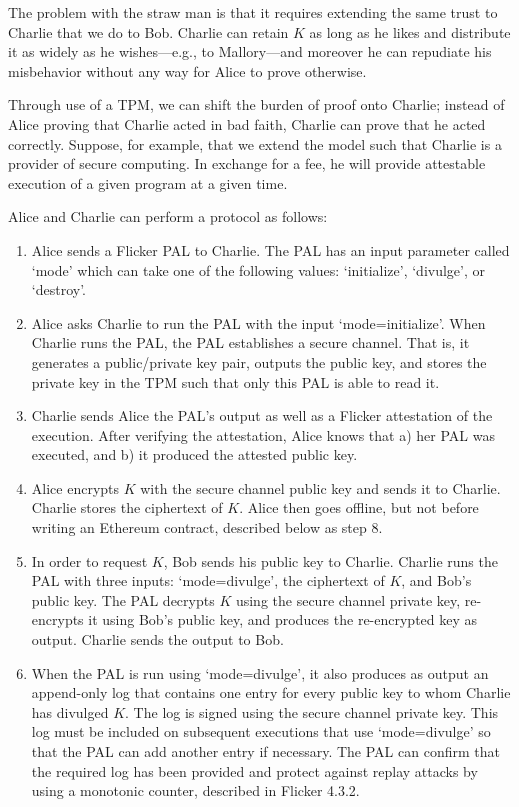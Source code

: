 \documentclass{article}
\begin{document}
The problem with the straw man is that it requires extending the same trust to Charlie that we do to Bob. Charlie can retain $K$ as long as he likes and distribute it as widely as he wishes---e.g., to Mallory---and moreover he can repudiate his misbehavior without any way for Alice to prove otherwise.

Through use of a TPM, we can shift the burden of proof onto Charlie; instead of Alice proving that Charlie acted in bad faith, Charlie can prove that he acted correctly. Suppose, for example, that we extend the model such that Charlie is a provider of secure computing. In exchange for a fee, he will provide attestable execution of a given program at a given time.

Alice and Charlie can perform a protocol as follows:

\begin{enumerate}

\item Alice sends a Flicker PAL to Charlie. The PAL has an input parameter called `mode' which can take one of the following values: `initialize', `divulge', or `destroy'. 

\item Alice asks Charlie to run the PAL with the input `mode=initialize'. When Charlie runs the PAL, the PAL establishes a secure channel. That is, it generates a public/private key pair, outputs the public key, and stores the private key in the TPM such that only this PAL is able to read it.

\item Charlie sends Alice the PAL's output as well as a Flicker attestation of the execution. After verifying the attestation, Alice knows that a) her PAL was executed, and b) it produced the attested public key.

\item Alice encrypts $K$ with the secure channel public key and sends it to Charlie. Charlie stores the ciphertext of $K$. Alice then goes offline, but not before writing an Ethereum contract, described below as step 8.

\item In order to request $K$, Bob sends his public key to Charlie. Charlie runs the PAL with three inputs: `mode=divulge', the ciphertext of $K$, and Bob's public key. The PAL decrypts $K$ using the secure channel private key, re-encrypts it using Bob's public key, and produces the re-encrypted key as output. Charlie sends the output to Bob.

\item When the PAL is run using `mode=divulge', it also produces as output an append-only log that contains one entry for every public key to whom Charlie has divulged $K$. The log is signed using the secure channel private key. This log must be included on subsequent executions that use `mode=divulge' so that the PAL can add another entry if necessary. The PAL can confirm that the required log has been provided and protect against replay attacks by using a monotonic counter, described in Flicker 4.3.2.


\end{enumerate}
\end{document}
